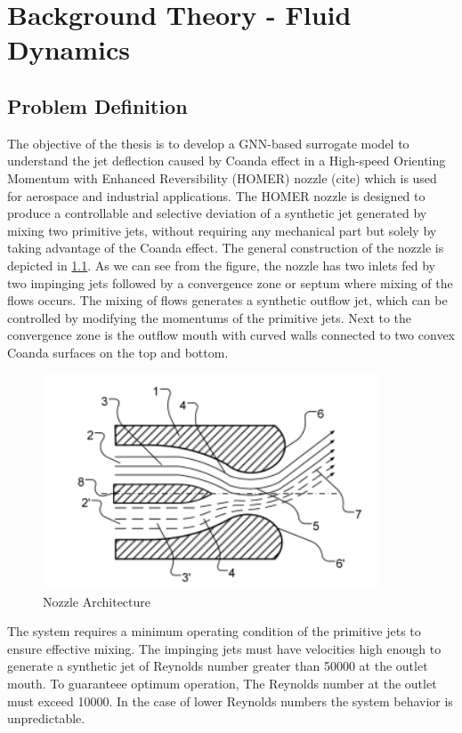 \chapter{Background Theory - Fluid Dynamics}
\label{chap:Theory-CFD}
\section{Problem Definition}
The objective of the thesis is to develop a GNN-based surrogate model to understand the jet deflection caused by Coanda effect in a High-speed Orienting Momentum with Enhanced Reversibility (HOMER) nozzle (cite) which is used for aerospace and industrial applications. The HOMER nozzle is designed to produce a controllable and selective deviation of a synthetic jet generated by mixing two primitive jets, without requiring any mechanical part but solely by taking advantage of the Coanda effect. The general construction of the nozzle is depicted in \ref{fig:nozzle}. As we can see from the figure, the nozzle has two inlets fed by two impinging jets followed by a convergence zone or septum where mixing of the flows occurs. The mixing of flows generates a synthetic outflow jet, which can be controlled by modifying the momentums of the primitive jets. Next to the convergence zone is the outflow mouth with curved walls connected to two convex Coanda surfaces on the top and bottom.

\begin{figure}[ht]
  \centering
  \includegraphics[width=10cm]{images/Theory-CFD/nozzle.png}
  \caption{Nozzle Architecture}
  \label{fig:nozzle}
\end{figure}

The system requires a minimum operating condition of the primitive jets to ensure effective mixing. The impinging jets must have velocities high enough to generate a synthetic jet of Reynolds number greater than 50000 at the outlet mouth. To guaranteee optimum operation, The Reynolds number at the outlet must exceed 10000. In the case of lower Reynolds numbers the system behavior is unpredictable. 
